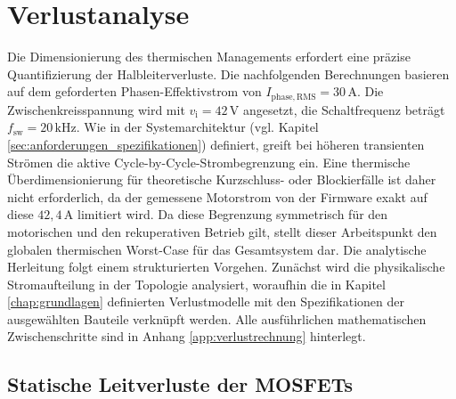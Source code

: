 \section{Verlustanalyse}
\label{sec:verlustanalyse}

Die Dimensionierung des thermischen Managements erfordert eine präzise Quantifizierung der Halbleiterverluste. Die nachfolgenden Berechnungen basieren auf dem geforderten Phasen-Effektivstrom von $I_{\mathrm{phase,RMS}} = 30\,\mathrm{A}$. Die Zwischenkreisspannung wird mit $v_{\mathrm{i}} = 42\,\mathrm{V}$ angesetzt, die Schaltfrequenz beträgt $f_{\mathrm{sw}} = 20\,\mathrm{kHz}$. 
Wie in der Systemarchitektur (vgl. Kapitel \ref{sec:anforderungen_spezifikationen}) definiert, greift bei höheren transienten Strömen die aktive Cycle-by-Cycle-Strombegrenzung ein. Eine thermische Überdimensionierung für theoretische Kurzschluss- oder Blockierfälle ist daher nicht erforderlich, da der gemessene Motorstrom von der Firmware exakt auf diese $42{,}4\,\mathrm{A}$ limitiert wird. Da diese Begrenzung symmetrisch für den motorischen und den rekuperativen Betrieb gilt, stellt dieser Arbeitspunkt den globalen thermischen Worst-Case für das Gesamtsystem dar.
Die analytische Herleitung folgt einem strukturierten Vorgehen. Zunächst wird die physikalische Stromaufteilung in der Topologie analysiert, woraufhin die in Kapitel \ref{chap:grundlagen} definierten Verlustmodelle mit den Spezifikationen der ausgewählten Bauteile verknüpft werden. Alle ausführlichen mathematischen Zwischenschritte sind in Anhang \ref{app:verlustrechnung} hinterlegt.

\subsection{Statische Leitverluste der MOSFETs}
\label{subsec:leitverluste}

